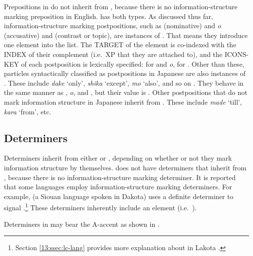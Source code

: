 Prepositions in  do not inherit from
, because there is no information-structure
marking preposition in English.   has both types. As
discussed thus far, information-structure marking postpositions, such
as {\ga} (nominative) and \textit{o} (accusative) and {\wa} (contrast
or topic), are instances of
. That means they introduce one element into
the  list. The TARGET of the  element is
co-indexed with the INDEX of their complement (i.e.\ XP that they are
attached to), and the ICONS-KEY of each postposition is lexically
specified:  for {\ga} and \textit{o},
 for \wa.  Other than these, 
particles syntactically classified as postpositions in Japanese are
also instances of .  These include
\textit{dake} `only', \textit{shika} `except', \textit{mo} `also', and
so on \citep{hasegawa:11,hasegawa:koenig:11}. They behave in the same
manner as {\ga}, \textit{o}, and {\wa}, but their  value
is . Other postpositions that do not
mark information structure in Japanese inherit from
. These include \textit{made} `till',
\textit{kara} `from', etc.





\subsection{Determiners}
\label{10:sssec:determiners}


Determiners inherit from either  or
, depending on whether or not they mark
information structure by themselves.   does not have
determiners that inherit from , because there
is no information-structure marking determiner.  It is reported that
some languages employ information-structure marking determiners. For
example,  (a Siouan language spoken in Dakota) uses a
definite determiner \textit{}
to signal .\footnote{Section \ref{13:ssec:lc-lang}
provides more explanation about
  \textit{} in Lakota .}
These determiners inherently include an  element
(i.e.\ ).


Determiners in  may bear the A-accent as shown in
.

